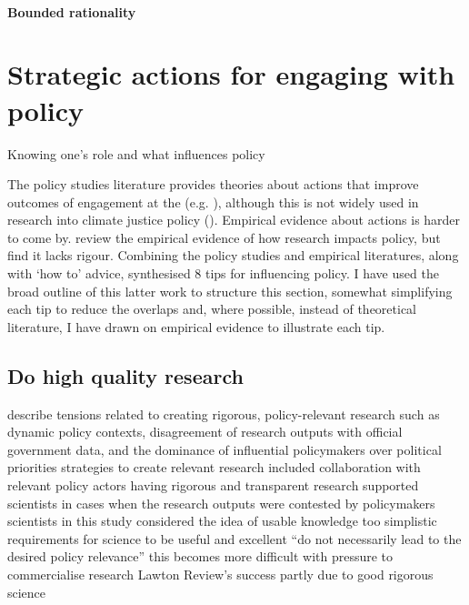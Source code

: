 \paragraph{Bounded rationality}

\section{Strategic actions for engaging with policy}

Knowing one's role and what influences policy 

The policy studies literature provides theories about actions that improve outcomes of engagement at the \SPI{} (e.g. \cite{RykielEtAl2002,McNie2007,Gluckman2014,BlessenohlS2022}), although this is not widely used in research into climate justice policy (\cite{CairneyTS2023}). Empirical evidence about actions is harder to come by. \textcite{OliverHBGC2022} review the empirical evidence of how research impacts policy, but find it lacks rigour. Combining the policy studies and empirical literatures, along with `how to' advice, \textcite{OliverC2019} synthesised  8 tips for influencing policy. I have used the broad outline of this latter work to structure this section, somewhat simplifying each tip to reduce the overlaps and, where possible, instead of theoretical literature, I have drawn on empirical evidence to illustrate each tip.

\subsection{Do high quality research}

\cite{OjanenBKP2021} describe tensions related to creating rigorous, policy-relevant research such as dynamic policy contexts, disagreement of research outputs with official government data, and the dominance of influential policymakers over political priorities
\cite{OjanenBKP2021} strategies to create relevant research included collaboration with relevant policy actors
\cite{OjanenBKP2021} having rigorous and transparent research supported scientists in cases when the research outputs were contested by policymakers
\cite{IbarraJOBCIMRS2022} scientists in this study considered the idea of usable knowledge too simplistic 
\cite{IbarraJOBCIMRS2022} requirements for science to be useful and excellent ``do not necessarily lead to the desired policy relevance''
\cite{DanfordDR2009} this becomes more difficult with pressure to commercialise research
\cite{RoseBOP2018} Lawton Review's success partly due to good rigorous science


